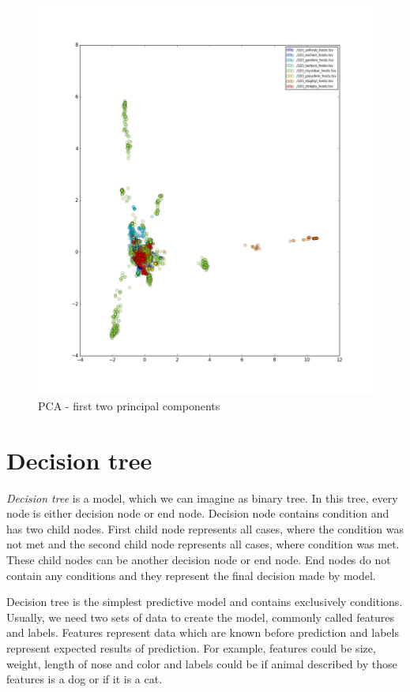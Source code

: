 \begin{figure}[htp]
\includegraphics[width=\linewidth]{./images/pca.png}
\centering
\caption{PCA - first two principal components}
\end{figure}

\section{Decision tree}
\emph{Decision tree} is a model, which we can imagine as binary tree.
In this tree, every node is either decision node or end node.
Decision node contains condition and has two child nodes.
First child node represents all cases, where the condition was not met and the second child node represents all cases, where condition was met.
These child nodes can be another decision node or end node.
End nodes do not contain any conditions and they represent the final decision made by model.

Decision tree is the simplest predictive model and contains exclusively conditions.
Usually, we need two sets of data to create the model, commonly called features and labels.
Features represent data which are known before prediction and labels represent expected results of prediction.
For example, features could be size, weight, length of nose and color and labels could be if animal described by those features is a dog or if it is a cat.


